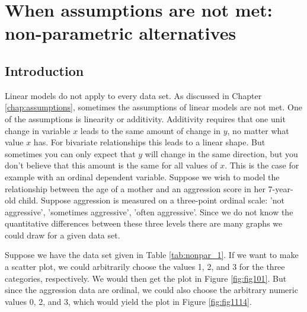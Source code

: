 \documentclass[]{book}\usepackage[]{graphicx}\usepackage[]{color}
\begin{document}

\chapter{When assumptions are not met: non-parametric alternatives}\label{chap:nonpar1}


\section{Introduction}

Linear models do not apply to every data set. As discussed in Chapter \ref{chap:assumptions}, sometimes the assumptions of linear models are not met. One of the assumptions is linearity or additivity. Additivity requires that one unit change in variable $x$ leads to the same amount of change in $y$, no matter what value $x$ has. For bivariate relationships this leads to a linear shape. But sometimes you can only expect that $y$ will change in the same direction, but you don't believe that this amount is the same for all values of $x$. This is the case for example with an ordinal dependent variable. Suppose we wish to model the relationship between the age of a mother and an aggression score in her 7-year-old child. Suppose aggression is measured on a three-point ordinal scale: 'not aggressive', 'sometimes aggressive', 'often aggressive'. Since we do not know the quantitative differences between these three levels there are many graphs we could draw for a given data set.


Suppose we have the data set given in Table \ref{tab:nonpar_1}. If we want to make a scatter plot, we could arbitrarily choose the values 1, 2, and 3 for the three categories, respectively. We would then get the plot in Figure \ref{fig:fig101}. But since the aggression data are ordinal, we could also choose the arbitrary numeric values 0, 2, and 3, which would yield the plot in Figure \ref{fig:fig1114}. 
\end{document}
